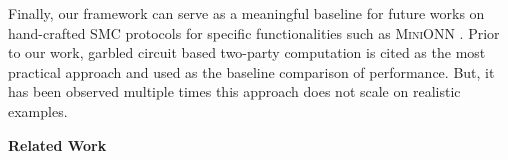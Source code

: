 Finally, our framework \tool can serve as a meaningful baseline for future works on hand-crafted SMC protocols for specific functionalities such as \textsc{MiniONN} \cite{minionn}. 
Prior to our work, garbled circuit based two-party computation is cited as the most practical approach and used as the baseline comparison of performance. But, it has been observed multiple times this approach does not scale on realistic examples.





%
%
%
%
%
%
%
%
%
%




\vspace{10pt}

\noindent\textbf{Related Work} 


\newpage